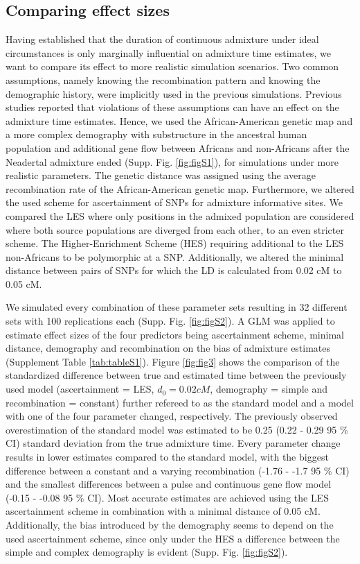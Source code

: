 \documentclass[]{article}
\begin{document}
\subsection{Comparing effect sizes}\label{comparing effect sizes}

Having established that the duration of continuous admixture under ideal
circumstances is only marginally influential on admixture time
estimates, we want to compare its effect to more realistic simulation scenarios. Two common assumptions, namely knowing the recombination pattern and knowing the demographic history, were implicitly used in the previous simulations.
Previous studies reported that violations of these assumptions can have an effect on the admixture time estimates.
 Hence, we used the African-American genetic map and a more complex demography with substructure in the ancestral human population and additional gene flow between Africans and non-Africans after the Neadertal admixture ended (Supp. Fig. \ref{fig:figS1}), for simulations under more realistic parameters. The genetic distance was assigned using the average recombination rate of the African-American genetic map.
 Furthermore, we altered the used scheme for ascertainment of SNPs for admixture informative sites. We compared the LES where only
positions in the admixed population are considered where both source
populations are diverged from each other, to an even stricter scheme. The Higher-Enrichment Scheme (HES) requiring additional
to the LES non-Africans to be polymorphic at a SNP. Additionally, we altered the minimal distance between pairs of SNPs for which the LD is calculated from 0.02 cM to 0.05 cM.



We simulated every combination of these parameter sets resulting in 32
different sets with 100 replications each (Supp. Fig. \ref{fig:figS2}).
A GLM was applied to estimate effect sizes of the four predictors being
ascertainment scheme, minimal distance, demography and recombination on
the bias of admixture estimates (Supplement Table \ref{tab:tableS1}).
Figure \ref{fig:fig3} shows the comparison of the standardized
difference between true and estimated time between the previously used
model (ascertainment = LES, \(d_{0} = 0.02 cM\), demography = simple and
recombination = constant) further refereed to as the standard model and
a model with one of the four parameter changed, respectively. The previously observed overestimation
of the standard model was estimated to be 0.25 (0.22 - 0.29 95 \% CI)
standard deviation from the true admixture time. Every parameter change
results in lower estimates compared to the standard model, with the
biggest difference between a constant and a varying recombination (-1.76
- -1.7 95 \% CI) and the smallest differences between a pulse and
continuous gene flow model (-0.15 - -0.08 95 \% CI). Most accurate
estimates are achieved using the LES ascertainment scheme in combination
with a minimal distance of 0.05 cM. Additionally, the bias introduced by
the demography seems to depend on the used ascertainment scheme, since
only under the HES a difference between the simple and complex
demography is evident (Supp. Fig. \ref{fig:figS2}).
\end{document}
